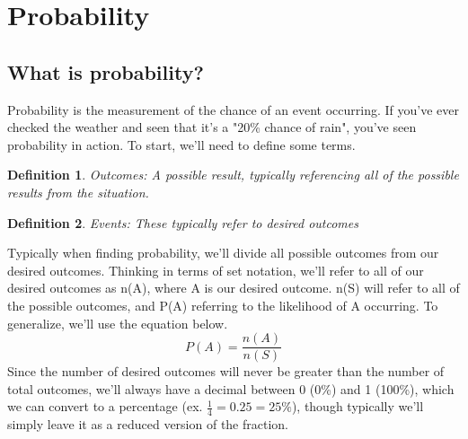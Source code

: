 \documentclass[final,1p,12pt]{elsarticle}
\newtheorem{definition}{Definition}
\begin{document}
\section{Probability}

    \subsection{What is probability?}
    Probability is the measurement of the chance of an event occurring.
    If you've ever checked the weather and seen that it's a "20\% chance of rain", you've seen probability in action.
    To start, we'll need to define some terms.
    \begin{definition}
        Outcomes: A possible result, typically referencing all of the possible results from the situation.
    \end{definition}
    \begin{definition}
        Events: These typically refer to desired outcomes
    \end{definition}
    Typically when finding probability, we'll divide all possible outcomes from our desired outcomes.
    Thinking in terms of set notation, we'll refer to all of our desired outcomes as n(A), where A is our desired outcome.
    n(S) will refer to all of the possible outcomes, and P(A) referring to the likelihood of A occurring.
    To generalize, we'll use the equation below.
    \begin{equation*}
        P(A) = \frac{n(A)}{n(S)}
    \end{equation*}
    Since the number of desired outcomes will never be greater than the number of total outcomes, we'll always have a decimal between 0 (0\%) and 1 (100\%), which we can convert to a percentage (ex. $\frac{1}{4}=0.25=25\%$), though typically we'll simply leave it as a reduced version of the fraction.
    
\end{document}
